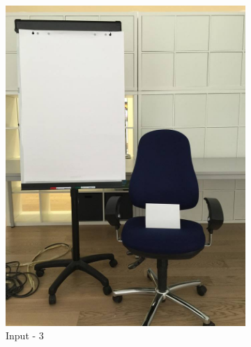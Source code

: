 \documentclass[paper=a4, fontsize=10pt]{scrartcl} %
\numberwithin{equation}{section} %
\numberwithin{figure}{section} %
\begin{document}
\begin{figure}
	\centering
	\begin{subfigure}[b]{0.35\textwidth}
		\includegraphics[width=\textwidth]{03}
		\caption{Input - 3}
		\label{fig:input_03}
	\end{subfigure}
	~ 
	\begin{subfigure}[b]{0.35\textwidth}

\end{subfigure}
\end{figure}
\end{document}
